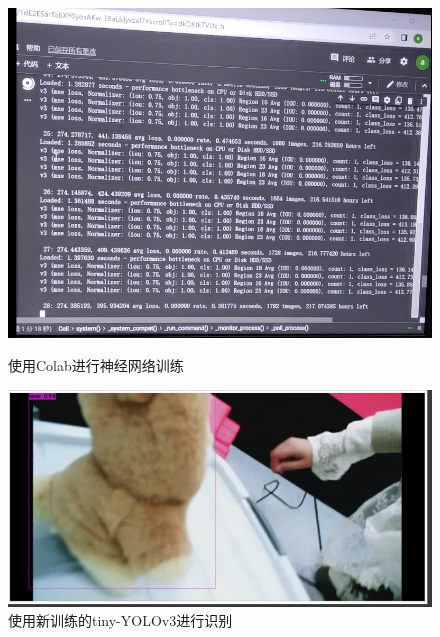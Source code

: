 \documentclass[a4paper,twoside]{article}
\begin{document}
\begin{figure}[htbp]
	\centering
	\begin{minipage}{0.49\linewidth}
		\centering
		\includegraphics[width=1.0\linewidth]{train.png}
		\caption{使用Colab进行神经网络训练}
	\end{minipage}
	\begin{minipage}{0.49\linewidth}
		\centering
		\includegraphics[width=1.0\linewidth]{yoloexample.png}
		\caption{使用新训练的tiny-YOLOv3进行识别}
	\end{minipage}
\end{figure}
\end{document}
